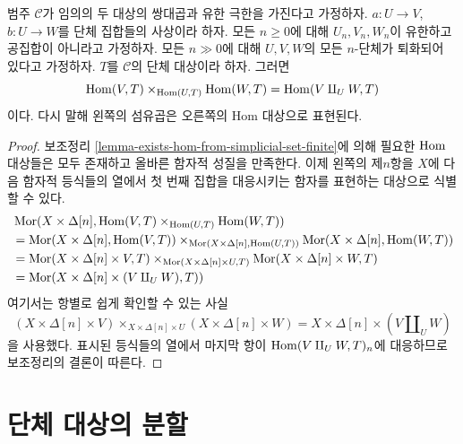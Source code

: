 \begin{lemma}
\label{lemma-hom-from-coprod}
범주 $\mathcal{C}$가 임의의 두 대상의 쌍대곱과 유한 극한을 가진다고
가정하자. $a : U \to V$, $b : U \to W$를 단체 집합들의 사상이라 하자.
모든 $n \geq 0$에 대해 $U_n, V_n, W_n$이 유한하고 공집합이 아니라고
가정하자. 모든 $n \gg 0$에 대해 $U, V, W$의 모든 $n$-단체가
퇴화되어 있다고 가정하자. $T$를 $\mathcal{C}$의 단체 대상이라 하자.
그러면
$$
\mathop{\mathrm{Hom}}\nolimits(V, T) \times_{\mathop{\mathrm{Hom}}\nolimits(U, T)} \mathop{\mathrm{Hom}}\nolimits(W, T)
=
\mathop{\mathrm{Hom}}\nolimits(V \amalg_U W, T)
$$
이다. 다시 말해 왼쪽의 섬유곱은 오른쪽의 Hom 대상으로 표현된다.
\end{lemma}

\begin{proof}
보조정리 \ref{lemma-exists-hom-from-simplicial-set-finite}에 의해 필요한
$\mathop{\mathrm{Hom}}\nolimits$ 대상들은 모두 존재하고 올바른 함자적 성질을 만족한다.
이제 왼쪽의 제$n$항을 $X$에 다음 함자적 등식들의 열에서 첫 번째
집합을 대응시키는 함자를 표현하는 대상으로 식별할 수 있다.
\begin{align*}
&
\mathop{\mathrm{Mor}}\nolimits(X \times \Delta[n],
\mathop{\mathrm{Hom}}\nolimits(V, T) \times_{\mathop{\mathrm{Hom}}\nolimits(U, T)} \mathop{\mathrm{Hom}}\nolimits(W, T)) \\
& =
\mathop{\mathrm{Mor}}\nolimits(X \times \Delta[n], \mathop{\mathrm{Hom}}\nolimits(V, T))
\times_{\mathop{\mathrm{Mor}}\nolimits(X \times \Delta[n], \mathop{\mathrm{Hom}}\nolimits(U, T))}
\mathop{\mathrm{Mor}}\nolimits(X \times \Delta[n], \mathop{\mathrm{Hom}}\nolimits(W, T)) \\
& =
\mathop{\mathrm{Mor}}\nolimits(X \times \Delta[n] \times V, T)
\times_{\mathop{\mathrm{Mor}}\nolimits(X \times \Delta[n] \times U, T)}
\mathop{\mathrm{Mor}}\nolimits(X \times \Delta[n] \times W, T) \\
& =
\mathop{\mathrm{Mor}}\nolimits(X \times \Delta[n] \times (V \amalg_U W), T))
\end{align*}
여기서는 항별로 쉽게 확인할 수 있는 사실
$$
(X \times \Delta[n] \times V)
\times_{X \times \Delta[n] \times U}
(X \times \Delta[n] \times W)
=
X \times \Delta[n] \times (V \amalg_U W)
$$
을 사용했다.
표시된 등식들의 열에서 마지막 항이 $\mathop{\mathrm{Hom}}\nolimits(V \amalg_U W, T)_n$에
대응하므로 보조정리의 결론이 따른다.
\end{proof}













\section{단체 대상의 분할}
\label{section-splitting}

